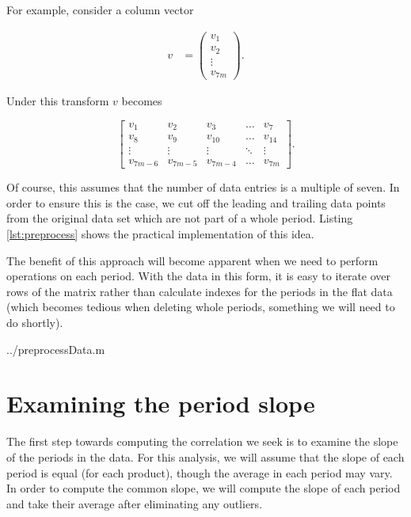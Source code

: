 For example, consider a column vector 

\begin{align}
   v &= \begin{pmatrix}
           v_{1} \\
           v_{2} \\
           \vdots \\
           v_{7m}
         \end{pmatrix}.
  \end{align}

Under this transform $v$ becomes

\[
\begin{bmatrix}
    v_{1} & v_{2} & v_{3} & \dots  & v_{7} \\
    v_{8} & v_{9} & v_{10} & \dots  & v_{14} \\
    \vdots & \vdots & \vdots & \ddots & \vdots \\
    v_{7m-6} & v_{7m-5} & v_{7m -4} & \dots  & v_{7m}
\end{bmatrix}.
\]

Of course, this assumes that the number of data entries is a multiple of seven. In order to ensure this is the case, we cut off the leading and trailing data points from the original data set which are not part of a whole period. Listing \ref{lst:preprocess} shows the practical implementation of this idea.

The benefit of this approach will become apparent when we need to perform operations on each period. With the data in this form, it is easy to iterate over rows of the matrix rather than calculate indexes for the periods in the flat data (which becomes tedious when deleting whole periods, something we will need to do shortly).

  {../preprocessData.m}

\section{Examining the period slope}

The first step towards computing the correlation we seek is to examine the slope of the periods in the data. For this analysis, we will assume that the slope of each period is equal (for each product), though the average in each period may vary. In order to compute the common slope, we will compute the slope of each period and take their average after eliminating any outliers.

